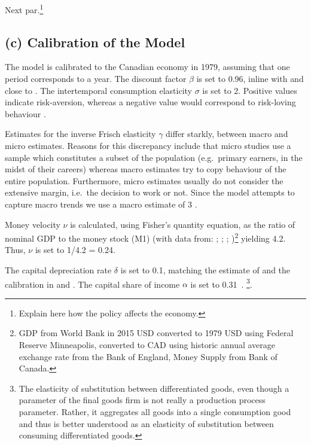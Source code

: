 \documentclass[12pt]{article}
\begin{document}
Next par.\footnote{Explain here how the policy affects the economy.}



\subsection*{(c) Calibration of the Model}
The model is calibrated to the Canadian economy in 1979, assuming that one period corresponds to a year. 
The discount factor $\beta$ is set to 0.96, inline with \textcite{someOilDemandSupply2023} and close to \textcite{corriganToTEMIIIBank2021}. 
The intertemporal consumption elasticity $\sigma$ is set to 2. Positive values indicate risk-aversion, whereas a negative value would correspond to risk-loving behaviour
\parencite{thimmeIntertemporalSubstitutionConsumption2017}.

Estimates for the inverse Frisch elasticity $\gamma$ differ starkly, between macro and micro estimates. Reasons for this discrepancy
include that micro studies use a sample which constitutes a subset of the population (e.g.\ primary earners, in the midst of their careers) whereas macro 
estimates try to copy behaviour of the entire population. Furthermore, micro estimates usually do not consider the extensive margin, i.e.\ the decision 
to work or not. Since the model attempts to capture macro trends we use a macro estimate of 3 \parencite{petermanReconcilingMicroMacro2016}. 

Money velocity $\nu$ is calculated, using Fisher's quantity equation, as the ratio of nominal GDP to the money stock (M1) (with data from: \textcite{bankofenglandCanadianDollarData2021}; 
\textcite{federalreservebankofminneapolisInflationCalculatorFederal}; \textcite{worldbankgroupWorldBankNational}; \textcite{bankofcanadaSelectedMonetaryAggregates})\footnote{GDP from World Bank in 2015 USD converted to 1979 USD using Federal Reserve Minneapolis, converted to CAD using historic annual average exchange rate from 
the Bank of England, Money Supply from Bank of Canada.} yielding 4.2. Thus, $\nu$ is set to 1/4.2 = 0.24. 

The capital depreciation rate $\delta$ is set to 0.1, matching the estimate of \textcite{statisticscanadaDepreciationRatesProductivity2007} and the calibration in \textcite{someOilDemandSupply2023} and \textcite{corriganToTEMIIIBank2021}.
The capital share of income $\alpha$ is set to 0.31~\parencite{fredst.louisShareLabourCompensation2021,feenstraNextGenerationPenn2015}. 
\footnote{The elasticity of substitution between differentiated goods, even though a parameter of the final goods firm is not really a production process parameter. 
Rather, it aggregates all goods into a single consumption good and thus is better understood as an elasticity of substitution between consuming differentiated goods.}. 
\end{document}
